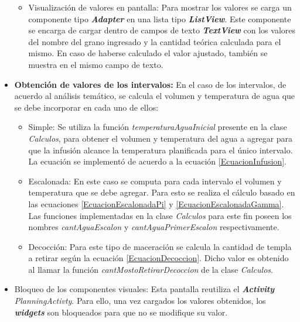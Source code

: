 \begin{itemize}
\begin{itemize}
                        \item Visualización de valores en pantalla: Para mostrar los valores se carga un componente tipo \textbf{ \textit{\gls{Adapter}}} en una lista tipo \textbf{\textit{\gls{ListView}}}. Este componente se encarga de cargar dentro de campos de texto \textbf{\textit{\gls{TextView}}} con los valores del nombre del grano ingresado y la cantidad teórica calculada para el mismo. En caso de haberse calculado el valor ajustado, también se muestra en el mismo campo de texto.
                    \end{itemize}
                
                \item \textbf{Obtención de valores de los intervalos:}
                    En el caso de los intervalos, de acuerdo al análisis temático, se calcula el volumen y temperatura de agua que se debe incorporar en cada uno de ellos:
                    \begin{itemize}
                        \item Simple: Se utiliza la función \textit{temperaturaAguaInicial} presente en la clase \textit{Calculos}, para obtener el volumen y temperatura del agua a agregar para que la infusión alcance la temperatura planificada para el único intervalo. La ecuación se implementó de acuerdo a la ecuación \ref{EcuacionInfusion}.
                    
                        \item Escalonada: En este caso se computa para cada intervalo el volumen y temperatura que se debe agregar. Para esto se realiza el cálculo basado en las ecuaciones \ref{EcuacionEscalonadaPi} y \ref{EcuacionEscalonadaGamma}. Las funciones implementadas en la clase \textit{Calculos} para este fin poseen los nombres \textit{cantAguaEscalon} y \textit{cantAguaPrimerEscalon} respectivamente.
                    
                        \item Decocción: Para este tipo de maceración se calcula la cantidad de templa a retirar según la ecuación \ref{EcuacionDecoccion}. Dicho valor es obtenido al llamar la función \textit{cantMostoRetirarDecoccion} de la clase \textit{Calculos}.
                    \end{itemize}
                    
                    \item Bloqueo de los componentes visuales:  Esta pantalla reutiliza el \textbf{\textit{Activity}} \textit{PlanningActivty}. Para ello, una vez cargados los valores obtenidos, los \textbf{\textit{\gls{widget}s}} son bloqueados para que no se modifique su valor.

            \end{itemize}
            
